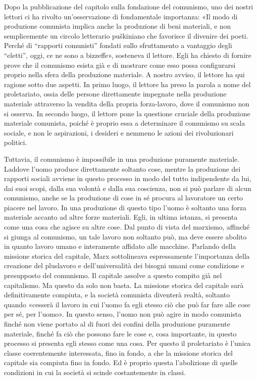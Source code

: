 \documentclass[12pt,a4paper,openany]{book}
\begin{document}
Dopo la pubblicazione del capitolo sulla fondazione del comunismo, uno dei nostri lettori ci ha rivolto un'osservazione di fondamentale importanza: «Il modo di produzione comunista implica anche la produzione di beni materiali, e non semplicemente un circolo letterario puškiniano che favorisce il divenire dei poeti. Perché di “rapporti comunisti” fondati sullo sfruttamento a vantaggio degli “eletti”, oggi, ce ne sono a bizzeffe», sosteneva il lettore. Egli ha chiesto di fornire prove che il comunismo esista già e di mostrare come esso possa configurarsi proprio nella sfera della produzione materiale. A nostro avviso, il lettore ha qui ragione sotto due aspetti. In primo luogo, il lettore ha preso la parola a nome del proletariato, ossia delle persone direttamente impegnate nella produzione materiale attraverso la vendita della propria forza-lavoro, dove il comunismo non si osserva. In secondo luogo, il lettore pone la questione cruciale della produzione materiale comunista, poiché è proprio essa a determinare il comunismo su scala sociale, e non le aspirazioni, i desideri e nemmeno le azioni dei rivoluzionari politici.

Tuttavia, il comunismo è impossibile in una produzione puramente materiale. Laddove l'uomo produce direttamente soltanto cose, mentre la produzione dei rapporti sociali avviene in questo processo in modo del tutto indipendente da lui, dai suoi scopi, dalla sua volontà e dalla sua coscienza, non si può parlare di alcun comunismo, anche se la produzione di cose in sé procura al lavoratore un certo piacere nel lavoro. In una produzione di questo tipo l'uomo è soltanto una forza materiale accanto ad altre forze materiali. Egli, in ultima istanza, si presenta come una cosa che agisce su altre cose. Dal punto di vista del marxismo, affinché si giunga al comunismo, un tale lavoro non soltanto può, ma deve essere abolito in quanto lavoro umano e interamente affidato alle macchine. Parlando della missione storica del capitale, Marx sottolineava espressamente l'importanza della creazione del pluslavoro e dell'universalità dei bisogni umani come condizione e presupposto del comunismo. Il capitale assolve a questo compito già nel capitalismo. Ma questo da solo non basta. La missione storica del capitale sarà definitivamente compiuta, e la società comunista diventerà realtà, soltanto quando «cesserà il lavoro in cui l'uomo fa egli stesso ciò che può far fare alle cose per sé, per l'uomo». In questo senso, l'uomo non può agire in modo comunista finché non viene portato al di fuori dei confini della produzione puramente materiale, finché fa ciò che possono fare le cose e, cosa importante, in questo processo si presenta egli stesso come una cosa. Per questo il proletariato è l'unica classe coerentemente interessata, fino in fondo, a che la missione storica del capitale sia compiuta fino in fondo. Ed è proprio questa l'abolizione di quelle condizioni in cui la società si scinde costantemente in classi.
\end{document}
